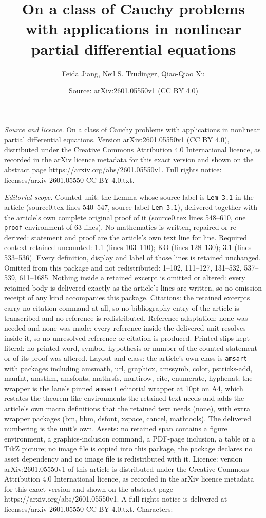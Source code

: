 \documentclass[10pt,a4paper]{amsart}
\title[On a class of Cauchy problems with applications in nonlinear]{On a class of Cauchy problems with applications in nonlinear partial differential equations}
\author{Feida Jiang, Neil S. Trudinger, Qiao-Qiao Xu}
\date{Source: arXiv:2601.05550v1 (CC BY 4.0)}
\begin{document}
\maketitle

\noindent\emph{Source and licence.} On a class of Cauchy problems with applications in nonlinear partial differential equations. Version arXiv:2601.05550v1 (CC BY 4.0), distributed under the Creative Commons Attribution 4.0 International licence, as recorded in the arXiv licence metadata for this exact version and shown on the abstract page https://arxiv.org/abs/2601.05550v1. Full rights notice: licenses/arxiv-2601.05550-CC-BY-4.0.txt.\par\smallskip

\noindent\textit{Editorial scope.} Counted unit: the Lemma whose source label is \texttt{Lem 3.1} in the article (source0.tex lines 540--547, source label \texttt{Lem 3.1}), delivered together with the article's own complete original proof of it (source0.tex lines 548--610, one \texttt{proof} environment of 63 lines). No mathematics is written, repaired or re-derived: statement and proof are the article's own text line for line. Required context retained uncounted: 1.1 (lines 103--110); KO (lines 128--130); 3.1 (lines 533--536). Every definition, display and label of those lines is retained unchanged. Omitted from this package and not redistributed: 1--102, 111--127, 131--532, 537--539, 611--1685. Nothing inside a retained excerpt is omitted or altered: every retained body is delivered exactly as the article's lines are written, so no omission receipt of any kind accompanies this package. Citations: the retained excerpts carry no citation command at all, so no bibliography entry of the article is transcribed and no reference is redistributed. Reference adaptation: none was needed and none was made; every reference inside the delivered unit resolves inside it, so no unresolved reference or citation is produced. Printed slips kept literal: no printed word, symbol, hypothesis or number of the counted statement or of its proof was altered. Layout and class: the article's own class is \texttt{amsart} with packages including amsmath, url, graphicx, amssymb, color, pstricks-add, manfnt, amsthm, amsfonts, mathrsfs, multirow, cite, enumerate, hyphenat; the wrapper is the lane's pinned \texttt{amsart} editorial wrapper at 10pt on A4, which restates the theorem-like environments the retained text needs and adds the article's own macro definitions that the retained text needs (none), with extra wrapper packages (bm, bbm, dsfont, xspace, cancel, mathtools). The delivered numbering is the unit's own. Assets: no retained span contains a figure environment, a graphics-inclusion command, a PDF-page inclusion, a table or a TikZ picture; no image file is copied into this package, the package declares no asset dependency and no image file is redistributed with it. Licence: version arXiv:2601.05550v1 of this article is distributed under the Creative Commons Attribution 4.0 International licence, as recorded in the arXiv licence metadata for this exact version and shown on the abstract page https://arxiv.org/abs/2601.05550v1. A full rights notice is delivered at licenses/arxiv-2601.05550-CC-BY-4.0.txt. Characters: 
\end{document}
